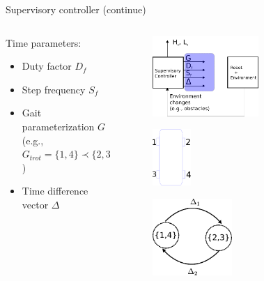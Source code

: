 \documentclass{beamer}
\begin{document}
\begin{frame}{Supervisory controller (continue)}
		\begin{columns}
		\hspace{1cm}
		\begin{column}{0.5\textwidth}
		Time parameters:
		\begin{itemize}
			\setlength\itemsep{3em}
			\item Duty factor $D_f$
			\item Step frequency $S_f$
			\item Gait parameterization $G$ (e.g., $G_{trot}=\{1,4\}\prec\{2,3\}$)
			\item Time difference vector $\Delta$
		\end{itemize}	
		
		\end{column}
		\begin{column}{0.5\textwidth}
			\begin{figure}[ht]\centering
				\includegraphics[width=0.6\textwidth]{images/Supervisoryb.pdf}
			\end{figure}
			\vspace{-0.25cm}\begin{figure}[ht]\centering
							\includegraphics[width=0.22\textwidth]{images/Numbers.pdf}
			\end{figure}
			\begin{figure}[ht]\centering
				\includegraphics[width=0.45\textwidth]{images/TrotTime.pdf}
			\end{figure}
		\end{column}
		\end{columns}
\end{frame}
\end{document}
